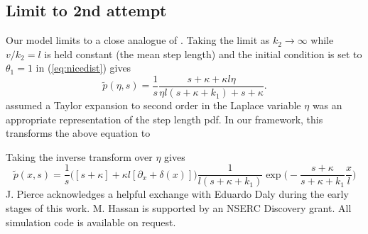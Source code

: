 \documentclass[]{agujournal2018}
\newcommand\be{\begin{equation}}
\newcommand\ee{\end{equation}}
\begin{document}
\subsection{Limit to \citet{Wu2019} 2nd attempt}
Our model limits to a close analogue of \citet{Wu2019}.
Taking the limit as $k_2 \rightarrow \infty$ while $v/k_2 = l$ is held constant (the mean step length) and the initial condition is set to $\theta_1=1$ in (\ref{eq:nicedist}) gives
\be\tilde{p}(\eta,s) = \frac{1}{s}\frac{s+\kappa + \kappa l \eta }{\eta l (s + \kappa + k_1) + s + \kappa} .\ee
\citet{Wu2019} assumed a Taylor expansion to second order in the Laplace variable $\eta$ was an appropriate representation of the step length pdf.
In our framework, this transforms the above equation to 
\be \ee



Taking the inverse transform over $\eta$ gives
\be \tilde{p}(x,s) = \frac{1}{s}\Big( [s+\kappa]+\kappa l[\partial_x + \delta(x)]\Big)\frac{1}{l(s+\kappa + k_1)}\exp\Big(- \frac{s+\kappa}{s+\kappa + k_1}\frac{x}{l}\Big)\ee
\acknowledgments
J. Pierce acknowledges a helpful exchange with Eduardo Daly during the early stages of this work. M. Hassan is supported by an NSERC Discovery grant. All simulation code is available on request.


\end{document}
